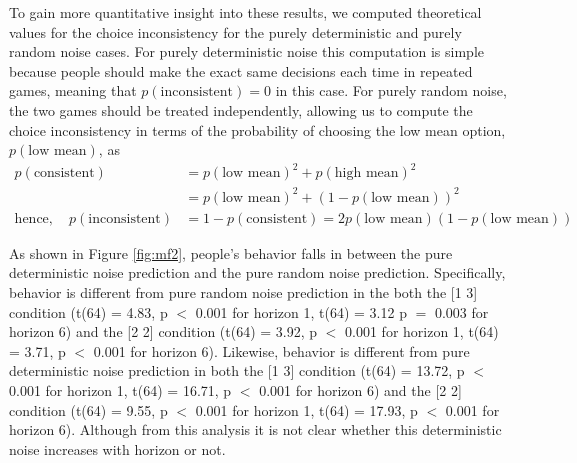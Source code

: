 \documentclass[12pt]{article}
\begin{document}
	To gain more quantitative insight into these results, we computed theoretical values for the choice inconsistency for the purely deterministic and purely random noise cases.  For purely deterministic noise this computation is simple because people should make the exact same decisions each time in repeated games, meaning that $p(\mbox{inconsistent}) = 0$ in this case. For purely random noise, the two games should be treated independently, allowing us to compute the choice inconsistency in terms of the probability of choosing the low mean option, $p(\mbox{low mean})$, as
	\begin{equation*}
		\begin{split}
			p(\mbox{consistent}) &= p(\mbox{low mean})^2 + p(\mbox{high mean})^2\\
			&= p(\mbox{low mean})^2 + (1-p(\mbox{low mean}))^2\\ 
			\mbox{hence},\quad p(\mbox{inconsistent}) &=  
			1 - p(\mbox{consistent}) = 
			2 p(\mbox{low mean})(1-p(\mbox{low mean}))
		\end{split}
	\end{equation*}
	
	As shown in Figure \ref{fig:mf2}, people's behavior falls in between the pure deterministic noise prediction and the pure random noise prediction. Specifically, behavior is different from pure random noise prediction in the both the [1 3] condition (t(64) = 4.83, p $<$ 0.001 for horizon 1, t(64) = 3.12 p $=$ 0.003 for horizon 6) and the [2 2] condition (t(64) = 3.92, p $<$ 0.001 for horizon 1, t(64) = 3.71, p $<$ 0.001 for horizon 6). Likewise, behavior is different from pure deterministic noise prediction in both the [1 3] condition (t(64) = 13.72, p $<$ 0.001 for horizon 1, t(64) = 16.71, p $<$ 0.001 for horizon 6) and the [2 2] condition (t(64) = 9.55, p $<$ 0.001 for horizon 1, t(64) = 17.93, p $<$ 0.001 for horizon 6).   Although from this analysis it is not clear whether this deterministic noise increases with horizon or not.
	
\end{document}
